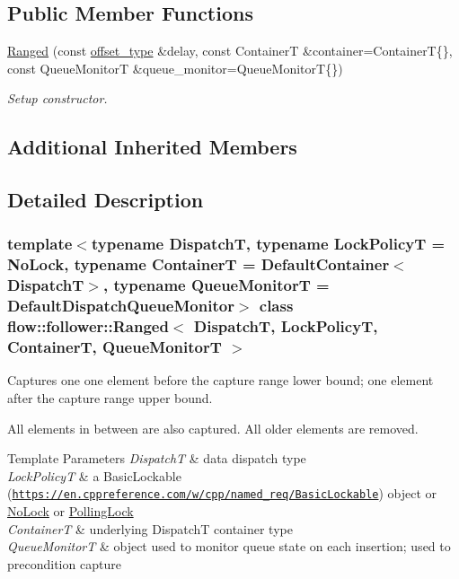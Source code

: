 \subsection*{Public Member Functions}
\begin{DoxyCompactItemize}
\item 
\hyperlink{classflow_1_1follower_1_1_ranged_aa9a1a3442f41771c8e00fea1bff4aad8}{Ranged} (const \hyperlink{classflow_1_1follower_1_1_ranged_ab117a88915944f22ee67326888858354}{offset\+\_\+type} \&delay, const ContainerT \&container=ContainerT\{\}, const Queue\+MonitorT \&queue\+\_\+monitor=Queue\+MonitorT\{\})
\begin{DoxyCompactList}\small\item\em Setup constructor. \end{DoxyCompactList}\end{DoxyCompactItemize}
\subsection*{Additional Inherited Members}


\subsection{Detailed Description}
\subsubsection*{template$<$typename DispatchT, typename Lock\+PolicyT = No\+Lock, typename ContainerT = Default\+Container$<$\+Dispatch\+T$>$, typename Queue\+MonitorT = Default\+Dispatch\+Queue\+Monitor$>$\newline
class flow\+::follower\+::\+Ranged$<$ Dispatch\+T, Lock\+Policy\+T, Container\+T, Queue\+Monitor\+T $>$}

Captures one one element before the capture range lower bound; one element after the capture range upper bound. 

All elements in between are also captured. All older elements are removed.


\begin{DoxyTemplParams}{Template Parameters}
{\em DispatchT} & data dispatch type \\
\hline
{\em Lock\+PolicyT} & a Basic\+Lockable (\href{https://en.cppreference.com/w/cpp/named_req/BasicLockable}{\tt https\+://en.\+cppreference.\+com/w/cpp/named\+\_\+req/\+Basic\+Lockable}) object or \hyperlink{structflow_1_1_no_lock}{No\+Lock} or \hyperlink{structflow_1_1_polling_lock}{Polling\+Lock} \\
\hline
{\em ContainerT} & underlying {\ttfamily DispatchT} container type \\
\hline
{\em Queue\+MonitorT} & object used to monitor queue state on each insertion; used to precondition capture \\
\hline
\end{DoxyTemplParams}


